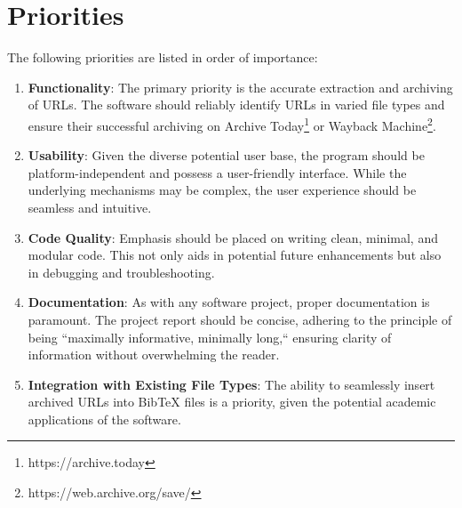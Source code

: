 \section{Priorities}
The following priorities are listed in order of importance:
\begin{enumerate}
    \item \textbf{Functionality}: The primary priority is the accurate extraction and archiving of URLs. The software should reliably identify URLs in varied file types and ensure their successful archiving on Archive Today\footnote{https://archive.today} or Wayback Machine\footnote{https://web.archive.org/save/}.
    \item \textbf{Usability}: Given the diverse potential user base, the program should be platform-independent and possess a user-friendly interface. While the underlying mechanisms may be complex, the user experience should be seamless and intuitive.
    \item \textbf{Code Quality}: Emphasis should be placed on writing clean, minimal, and modular code. This not only aids in potential future enhancements but also in debugging and troubleshooting.
    \item \textbf{Documentation}: As with any software project, proper documentation is paramount. The project report should be concise, adhering to the principle of being ``maximally informative, minimally long,`` ensuring clarity of information without overwhelming the reader.
    \item \textbf{Integration with Existing File Types}: The ability to seamlessly insert archived URLs into BibTeX files is a priority, given the potential academic applications of the software.
\end{enumerate}